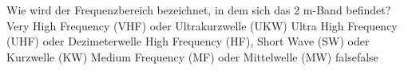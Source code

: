     {Wie wird der Frequenzbereich bezeichnet, in dem sich das 2 m-Band befindet?}
    {Very High Frequency (VHF) oder Ultrakurzwelle (UKW)}
    {Ultra High Frequency (UHF) oder Dezimeterwelle}
    {High Frequency (HF), Short Wave (SW) oder Kurzwelle (KW)}
    {Medium Frequency (MF) oder Mittelwelle (MW)}
    {false}{false}